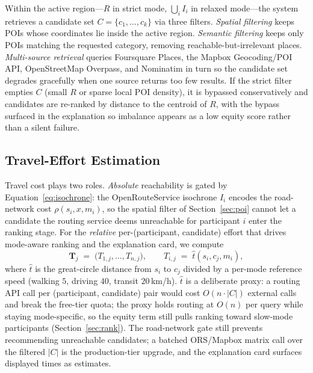 \documentclass[sigconf]{acmart}
\begin{document}
Within the active region---$R$ in strict mode, $\bigcup_i I_i$ in relaxed mode---the system retrieves a candidate set $C = \{c_1, \ldots, c_k\}$ via three filters. \emph{Spatial filtering} keeps POIs whose coordinates lie inside the active region. \emph{Semantic filtering} keeps only POIs matching the requested category, removing reachable-but-irrelevant places. \emph{Multi-source retrieval} queries Foursquare Places, the Mapbox Geocoding/POI API, OpenStreetMap Overpass, and Nominatim in turn so the candidate set degrades gracefully when one source returns too few results. If the strict filter empties $C$ (small $R$ or sparse local POI density), it is bypassed conservatively and candidates are re-ranked by distance to the centroid of $R$, with the bypass surfaced in the explanation so imbalance appears as a low equity score rather than a silent failure.

\subsection{Travel-Effort Estimation}
\label{sec:rte}

Travel cost plays two roles. \emph{Absolute} reachability is gated by Equation~\eqref{eq:isochrone}: the OpenRouteService isochrone $I_i$ encodes the road-network cost $\rho(s_i, x, m_i)$, so the spatial filter of Section~\ref{sec:poi} cannot let a candidate the routing service deems unreachable for participant $i$ enter the ranking stage. For the \emph{relative} per-(participant, candidate) effort that drives mode-aware ranking and the explanation card, we compute
\begin{equation}
  \mathbf{T}_j \;=\; \bigl(T_{1,j}, \ldots, T_{n,j}\bigr), \qquad
  T_{i,j} \;=\; \hat{t}(s_i, c_j, m_i),
  \label{eq:tvec}
\end{equation}
where $\hat{t}$ is the great-circle distance from $s_i$ to $c_j$ divided by a per-mode reference speed (walking $5$, driving $40$, transit $20$\,km/h). $\hat{t}$ is a deliberate proxy: a routing API call per (participant, candidate) pair would cost $O(n \cdot |C|)$ external calls and break the free-tier quota; the proxy holds routing at $O(n)$ per query while staying mode-specific, so the equity term still pulls ranking toward slow-mode participants (Section~\ref{sec:rank}). The road-network gate still prevents recommending unreachable candidates; a batched ORS/Mapbox matrix call over the filtered $|C|$ is the production-tier upgrade, and the explanation card surfaces displayed times as estimates.
\end{document}
